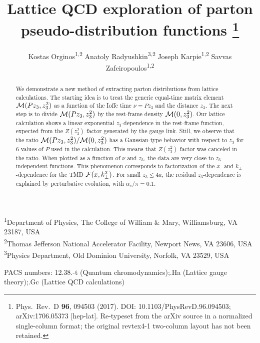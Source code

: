 \documentclass[11pt]{article}
\title{\bfseries Lattice QCD exploration of parton pseudo-distribution functions%
\thanks{Phys.\ Rev.\ D {\bf 96}, 094503 (2017).
DOI: 10.1103/PhysRevD.96.094503; arXiv:1706.05373 [hep-lat].
Re-typeset from the arXiv source in a normalized single-column format;
the original revtex4-1 two-column layout has not been retained.}}
\author{Kostas Orginos\textsuperscript{1,2}\quad
        Anatoly Radyushkin\textsuperscript{3,2}\quad
        Joseph Karpie\textsuperscript{1,2}\quad
        Savvas Zafeiropoulos\textsuperscript{1,2}}
\date{}
\begin{document}
\maketitle

\begin{center}\small
\textsuperscript{1}Department of Physics, The College of William \& Mary,
Williamsburg, VA 23187, USA\\
\textsuperscript{2}Thomas Jefferson National Accelerator Facility,
Newport News, VA 23606, USA\\
\textsuperscript{3}Physics Department, Old Dominion University,
Norfolk, VA 23529, USA
\end{center}

\begin{center}\small
PACS numbers: 12.38.-t (Quantum chromodynamics);.Ha (Lattice gauge theory);.Gc (Lattice QCD calculations)
\end{center}

\begin{abstract}
\noindent
We demonstrate    a new method of extracting
 parton distributions from lattice calculations.
 The starting idea is to treat the generic equal-time
  matrix element ${\cal M} (Pz_3, z_3^2)$  as a function
  of the Ioffe time $\nu = Pz_3$ and the distance $z_3$. The
  next step  is to  divide ${\cal M} (Pz_3, z_3^2)$  by   the rest-frame density
   ${\cal M} (0, z_3^2)$.
 Our lattice calculation  shows  a linear  exponential  $z_3$-dependence
    in the rest-frame function,  expected from  the $Z(z_3^2)$ factor
    generated by the gauge link.
 Still, we observe that  the ratio ${\cal M} (Pz_3 , z_3^2)/{\cal M} (0, z_3^2)$
    has a Gaussian-type  behavior with respect to $z_3$ for  6
    values of $P$ used in the calculation.
    This means that $Z(z_3^2)$ factor was  canceled  in the ratio.
When plotted as a function of $\nu$ and $z_3$, the data
    are very close
    to $z_3$-independent functions. This  phenomenon corresponds to
    factorization of the $x$- and $k_\perp$-dependence
    for the  TMD ${\cal F} (x, k_\perp^2)$.
For small $z_3 \leq 4a$,  the residual  $z_3$-dependence
    is  explained by  perturbative evolution, with  $\alpha_s/\pi =0.1$.
\end{abstract}








\end{document}
